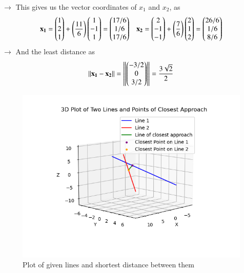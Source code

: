 \documentclass[journal]{IEEEtran}
\begin{document}
$\longrightarrow$ This gives us the vector coordinates of $x_1$ and $x_2$, as
\begin{align}
\mathbf{x_1} = \begin{pmatrix}1\\2\\1\end{pmatrix} + \left(\frac{11}{6}\right)\begin{pmatrix}1\\-1\\1\end{pmatrix} = \begin{pmatrix}17/6\\1/6\\17/6\end{pmatrix} &&
\mathbf{x_2} = \begin{pmatrix}2\\-1\\-1\end{pmatrix} + \left(\frac{7}{6}\right)\begin{pmatrix}2\\1\\2\end{pmatrix} = \begin{pmatrix}26/6\\1/6\\8/6\end{pmatrix}
\end{align}
$\rightarrow$ And the least distance as
\begin{align}
    \left\lVert\mathbf{x_1}-\mathbf{x_2}\right\rVert=\left\lVert\begin{pmatrix}-3/2\\0\\3/2\end{pmatrix}\right\rVert=\frac{3\sqrt{2}}{2}
\end{align}
\begin{figure}[h!]
   \centering
   \includegraphics[width=\linewidth]{figs/01.png}
   \caption{Plot of given lines and shortest distance between them}
   \label{Plot_1}
\end{figure}
\end{document}
